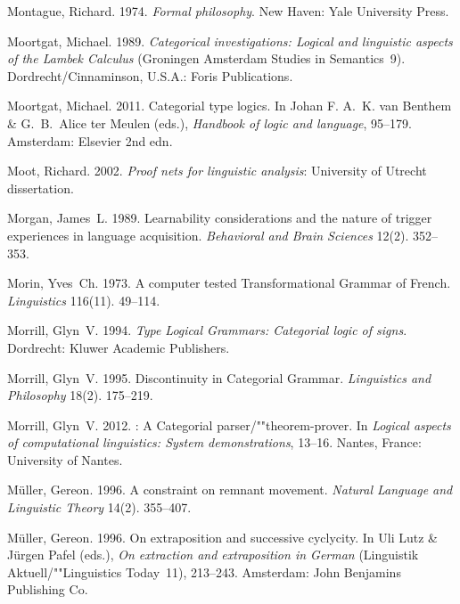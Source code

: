 \begin{thebibliography}{1420}
Montague, Richard. 1974.
\newblock \emph{Formal philosophy}.
\newblock New Haven: Yale University Press.

Moortgat, Michael. 1989.
\newblock \emph{Categorical investigations: {Logical} and linguistic aspects of
  the {Lambek Calculus}} (Groningen Amsterdam Studies in Semantics~9).
\newblock Dordrecht/Cinnaminson, U.S.A.: Foris Publications.

Moortgat, Michael. 2011.
\newblock Categorial type logics.
\newblock In Johan F. A.~K. {van Benthem} \& G.~B.~Alice {ter Meulen} (eds.),
  \emph{Handbook of logic and language}, 95--179. Amsterdam: Elsevier 2nd edn.

Moot, Richard. 2002.
\newblock \emph{Proof nets for linguistic analysis}: University of Utrecht
  dissertation.

Morgan, James~L. 1989.
\newblock Learnability considerations and the nature of trigger experiences in
  language acquisition.
\newblock \emph{Behavioral and Brain Sciences} 12(2). 352--353.

Morin, Yves~Ch. 1973.
\newblock A computer tested {Transformational Grammar} of {French}.
\newblock \emph{Linguistics} 116(11). 49--114.

Morrill, Glyn~V. 1994.
\newblock \emph{{Type Logical Grammars}: {Categorial} logic of signs}.
\newblock Dordrecht: Kluwer Academic Publishers.

Morrill, Glyn~V. 1995.
\newblock Discontinuity in {Categorial Grammar}.
\newblock \emph{Linguistics and Philosophy} 18(2). 175--219.

Morrill, Glyn~V. 2012.
: {A} {Categorial} parser/""theorem-prover.
\newblock In \emph{Logical aspects of computational linguistics: {System}
  demonstrations}, 13--16. Nantes, France: University of Nantes.

M{\"u}ller, Gereon. 1996{}.
\newblock A constraint on remnant movement.
\newblock \emph{Natural Language and Linguistic Theory} 14(2). 355--407.

M{\"u}ller, Gereon. 1996{}.
\newblock On extraposition and successive cyclycity.
\newblock In Uli Lutz \& J{\"u}rgen Pafel (eds.), \emph{On extraction and
  extraposition in {German}} (Linguistik Aktuell/""Linguistics Today~11),
  213--243. Amsterdam: John Benjamins Publishing Co.


\end{thebibliography}
